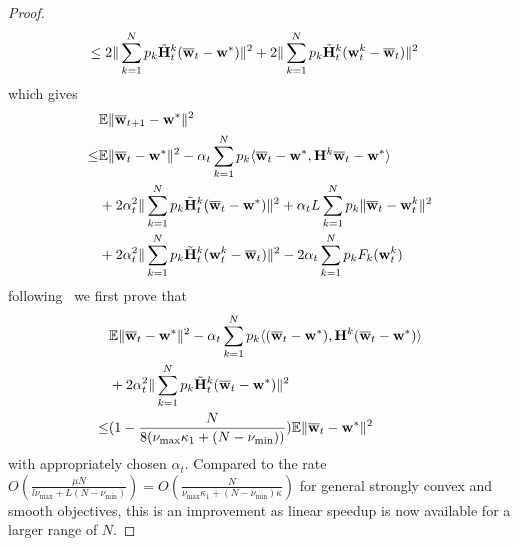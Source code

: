 \begin{proof}
\begin{align*}
	& \leq2\|\sum_{k=1}^{N}p_{k}\tilde{{\mathbf{H}}}_{t}^{k}({\overline{\mathbf{w}}}_{t}-{\mathbf{w}}^{\ast})\|^{2}+2\|\sum_{k=1}^{N}p_{k}\tilde{{\mathbf{H}}}_{t}^{k}({\mathbf{w}}_{t}^{k}-{\overline{\mathbf{w}}}_{t})\|^{2}
	\end{align*}
	which gives 
	\begin{align*}
	& \mathbb{E}\|{\overline{\mathbf{w}}}_{t+1}-{\mathbf{w}}^{\ast}\|^{2} \\
	\leq &\mathbb{E}\|{\overline{\mathbf{w}}}_{t}-{\mathbf{w}}^{\ast}\|^{2}-\alpha_{t}\sum_{k=1}^{N}p_{k}\langle{\overline{\mathbf{w}}}_{t}-{\mathbf{w}}^{\ast},{\mathbf{H}}^{k}{\overline{\mathbf{w}}}_{t}-{\mathbf{w}}^{\ast}\rangle \\ 
	& +2\alpha_{t}^{2}\|\sum_{k=1}^{N}p_{k}\tilde{{\mathbf{H}}}_{t}^{k}({\overline{\mathbf{w}}}_{t}-{\mathbf{w}}^{\ast})\|^{2}+\alpha_{t}L\sum_{k=1}^{N}p_{k}\|{\overline{\mathbf{w}}}_{t}-{\mathbf{w}}_{t}^{k}\|^{2} \\
	& +2\alpha_{t}^{2}\|\sum_{k=1}^{N}p_{k}\tilde{{\mathbf{H}}}_{t}^{k}({\mathbf{w}}_{t}^{k}-{\overline{\mathbf{w}}}_{t})\|^{2}-2\alpha_{t}\sum_{k=1}^{N}p_{k}F_{k}({\mathbf{w}}_{t}^{k})
	\end{align*}
	following~\cite{ma2017power} we first prove that 
	\begin{align*}
	& \mathbb{E}\|{\overline{\mathbf{w}}}_{t}-{\mathbf{w}}^{\ast}\|^{2}-\alpha_{t}\sum_{k=1}^{N}p_{k}\langle({\overline{\mathbf{w}}}_{t}-{\mathbf{w}}^{\ast}),{\mathbf{H}}^{k}({\overline{\mathbf{w}}}_{t}-{\mathbf{w}}^{\ast})\rangle
	\\
	&+2\alpha_{t}^{2}\|\sum_{k=1}^{N}p_{k}\tilde{{\mathbf{H}}}_{t}^{k}({\overline{\mathbf{w}}}_{t}-{\mathbf{w}}^{\ast})\|^{2}\\
	\leq&(1-\frac{N}{8(\nu_{\max}\kappa_{1}+(N-\nu_{\min}))})\mathbb{E}\|{\overline{\mathbf{w}}}_{t}-{\mathbf{w}}^{\ast}\|^{2}
	\end{align*}
	with appropriately chosen $\alpha_{t}$. Compared to the rate $O(\frac{\mu N}{l\nu_{\max}+L(N-\nu_{\min})})=O(\frac{N}{\nu_{\max}\kappa_{1}+(N-\nu_{\min})\kappa})$
	for general strongly convex and smooth objectives, this is an improvement
	as linear speedup is now available for a larger range of $N$. 
	

\end{proof}
